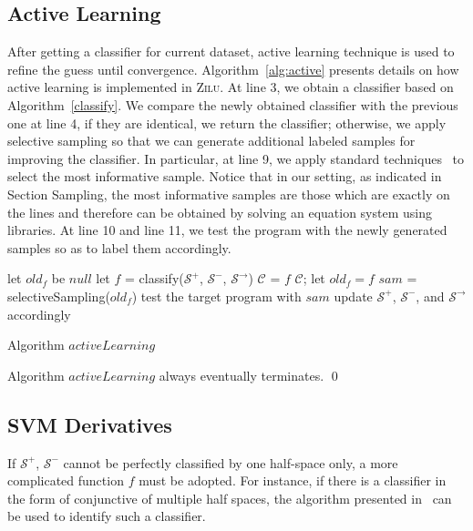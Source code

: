 \subsection{Active Learning} 
After getting a classifier for current dataset, active learning technique is used to refine the guess until convergence. 
Algorithm~\ref{alg:active} presents details on how active learning is implemented in \textsc{Zilu}. 
At line 3, we obtain a classifier based on Algorithm~\ref{classify}. 
We compare the newly obtained classifier with the previous one at line 4, if they are identical, we return the classifier; 
otherwise, we apply selective sampling so that we can generate additional labeled samples for improving the classifier. 
In particular, at line 9, we apply standard techniques~\cite{DBLP:conf/icml/SchohnC00} to select the most informative sample. 
Notice that in our setting, as indicated in Section Sampling, the most informative samples are those which are exactly on the lines 
and therefore can be obtained by solving an equation system using libraries. 
At line 10 and line 11, we test the program with the newly generated samples so as to label them accordingly.
\begin{algorithm}[!h]
\SetAlgoVlined
\Indm
{}
\Indp
let $old_f$ be $null$\;
 {
    let $f$ = classify($\mathcal{S}^+$, $\mathcal{S}^-$, $\mathcal{S}^\rightarrow$)\;
     {
         {
            $\mathcal{C}$ = $f$\;
            \Return $\mathcal{C}$;
        }
        let $old_f = f$\;
    }
    $sam$ = selectiveSampling($old_f$)\;
    test the target program with $sam$\;
    update $\mathcal{S}^+$, $\mathcal{S}^-$, and $\mathcal{S}^\rightarrow$ accordingly\;
}
\caption{Algorithm $activeLearning$}
\label{alg:active}
\end{algorithm}


\begin{example}
\end{example}

\begin{proposition}
Algorithm $activeLearning$ always eventually terminates. \hfill \qed
\end{proposition}


\subsection{SVM Derivatives}
If $\mathcal{S}^+$, $\mathcal{S}^-$ cannot be perfectly classified by one half-space only, 
a more complicated function $f$ must be adopted. 
For instance, if there is a classifier in the form of conjunctive of multiple half spaces, 
the algorithm presented in~\cite{Sharma2012} can be used to identify such a classifier.

